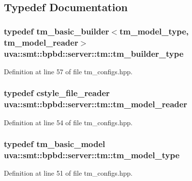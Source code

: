 \subsection{Typedef Documentation}
\hypertarget{namespaceuva_1_1smt_1_1bpbd_1_1server_1_1tm_a29c513cbd5b9a3c3838ad34e5103776f}{}
\subsubsection[{tm\+\_\+builder\+\_\+type}]{\setlength{\rightskip}{0pt plus 5cm}typedef {\bf tm\+\_\+basic\+\_\+builder}$<${\bf tm\+\_\+model\+\_\+type}, {\bf tm\+\_\+model\+\_\+reader}$>$ {\bf uva\+::smt\+::bpbd\+::server\+::tm\+::tm\+\_\+builder\+\_\+type}}\label{namespaceuva_1_1smt_1_1bpbd_1_1server_1_1tm_a29c513cbd5b9a3c3838ad34e5103776f}


Definition at line 57 of file tm\+\_\+configs.\+hpp.

\hypertarget{namespaceuva_1_1smt_1_1bpbd_1_1server_1_1tm_a252830a0bbad1555180821ed6ffce83f}{}
\subsubsection[{tm\+\_\+model\+\_\+reader}]{\setlength{\rightskip}{0pt plus 5cm}typedef {\bf cstyle\+\_\+file\+\_\+reader} {\bf uva\+::smt\+::bpbd\+::server\+::tm\+::tm\+\_\+model\+\_\+reader}}\label{namespaceuva_1_1smt_1_1bpbd_1_1server_1_1tm_a252830a0bbad1555180821ed6ffce83f}


Definition at line 54 of file tm\+\_\+configs.\+hpp.

\hypertarget{namespaceuva_1_1smt_1_1bpbd_1_1server_1_1tm_a2f41d3b9fcee3dddc005fd7e7deae402}{}
\subsubsection[{tm\+\_\+model\+\_\+type}]{\setlength{\rightskip}{0pt plus 5cm}typedef {\bf tm\+\_\+basic\+\_\+model} {\bf uva\+::smt\+::bpbd\+::server\+::tm\+::tm\+\_\+model\+\_\+type}}\label{namespaceuva_1_1smt_1_1bpbd_1_1server_1_1tm_a2f41d3b9fcee3dddc005fd7e7deae402}


Definition at line 51 of file tm\+\_\+configs.\+hpp.

